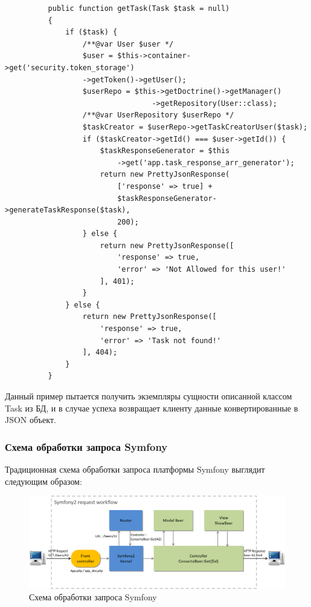\begin{lstlisting}
          public function getTask(Task $task = null)
          {
              if ($task) {
                  /**@var User $user */
                  $user = $this->container->get('security.token_storage')
                  ->getToken()->getUser();
                  $userRepo = $this->getDoctrine()->getManager()
                                  ->getRepository(User::class);
                  /**@var UserRepository $userRepo */
                  $taskCreator = $userRepo->getTaskCreatorUser($task);
                  if ($taskCreator->getId() === $user->getId()) {
                      $taskResponseGenerator = $this
                          ->get('app.task_response_arr_generator');
                      return new PrettyJsonResponse(
                          ['response' => true] + 
                          $taskResponseGenerator->generateTaskResponse($task),
                          200);
                  } else {
                      return new PrettyJsonResponse([
                          'response' => true,
                          'error' => 'Not Allowed for this user!'
                      ], 401);
                  }
              } else {
                  return new PrettyJsonResponse([
                      'response' => true,
                      'error' => 'Task not found!'
                  ], 404);
              }
          }
\end{lstlisting}
Данный пример пытается получить экземпляры сущности описанной классом Task из БД, и в случае успеха возвращает клиенту данные конвертированные в JSON объект. 

\subsubsection{Схема обработки запроса Symfony }
Традиционная схема обработки запроса платформы Symfony выглядит следующим образом:
\begin{figure}[ht]
\centering
  \includegraphics[scale=0.35]{images/request-workflow.png}  
  \caption{  Схема обработки запроса Symfony }
  \label{fig:domain:symfony_request_workflow}
\end{figure}

